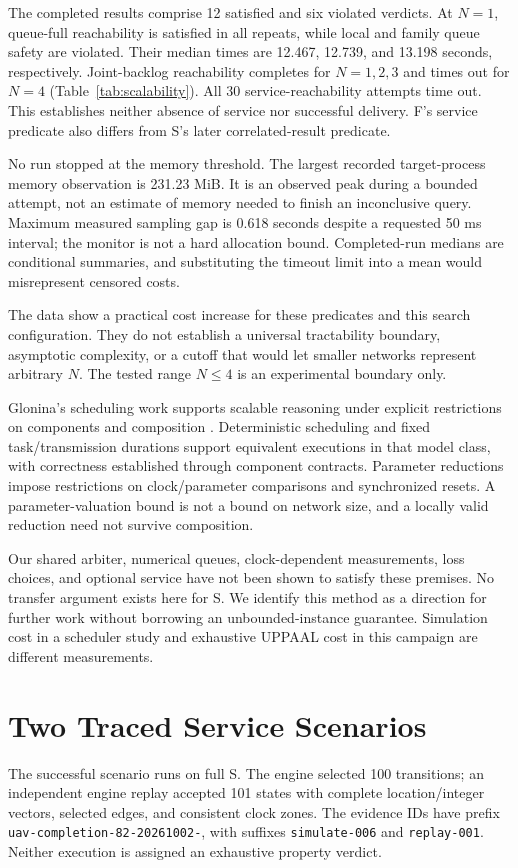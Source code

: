 \documentclass[runningheads]{llncs}
\newcommand{\code}[1]{\texttt{#1}}
\begin{document}
The completed results comprise 12 satisfied and six violated verdicts. At $N=1$, queue-full reachability is satisfied in all repeats, while local and family queue safety are violated. Their median times are 12.467, 12.739, and 13.198 seconds, respectively. Joint-backlog reachability completes for $N=1,2,3$ and times out for $N=4$ (Table~\ref{tab:scalability}). All 30 service-reachability attempts time out. This establishes neither absence of service nor successful delivery. F's service predicate also differs from S's later correlated-result predicate.

No run stopped at the memory threshold. The largest recorded target-process memory observation is 231.23 MiB. It is an observed peak during a bounded attempt, not an estimate of memory needed to finish an inconclusive query. Maximum measured sampling gap is 0.618 seconds despite a requested 50 ms interval; the monitor is not a hard allocation bound. Completed-run medians are conditional summaries, and substituting the timeout limit into a mean would misrepresent censored costs.

The data show a practical cost increase for these predicates and this search configuration. They do not establish a universal tractability boundary, asymptotic complexity, or a cutoff that would let smaller networks represent arbitrary $N$. The tested range $N\le4$ is an experimental boundary only.

Glonina's scheduling work supports scalable reasoning under explicit restrictions on components and composition \cite{glonina_thesis_2021,glonina_correctness_2018}. Deterministic scheduling and fixed task/transmission durations support equivalent executions in that model class, with correctness established through component contracts. Parameter reductions impose restrictions on clock/parameter comparisons and synchronized resets. A parameter-valuation bound is not a bound on network size, and a locally valid reduction need not survive composition.

Our shared arbiter, numerical queues, clock-dependent measurements, loss choices, and optional service have not been shown to satisfy these premises. No transfer argument exists here for S. We identify this method as a direction for further work without borrowing an unbounded-instance guarantee. Simulation cost in a scheduler study and exhaustive UPPAAL cost in this campaign are different measurements.

\section{Two Traced Service Scenarios}\label{sec:scenario}
The successful scenario runs on full S. The engine selected 100 transitions; an independent engine replay accepted 101 states with complete location/integer vectors, selected edges, and consistent clock zones. The evidence IDs have prefix \code{uav-completion-82-20261002-}, with suffixes \code{simulate-006} and \code{replay-001}. Neither execution is assigned an exhaustive property verdict.
\end{document}
